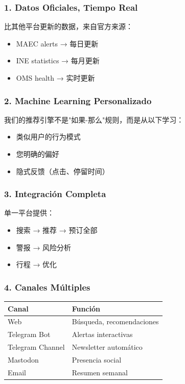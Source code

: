 \documentclass[11pt]{article}
\begin{document}
\subsubsection{1. Datos Oficiales, Tiempo Real}
\label{sec:org416fa64}

比其他平台更新的数据，来自官方来源：
\begin{itemize}
\item MAEC alerts → 每日更新
\item INE statistics → 每月更新
\item OMS health → 实时更新
\end{itemize}

\subsubsection{2. Machine Learning Personalizado}
\label{sec:orgc3e0df2}

我们的推荐引擎不是"如果-那么"规则，而是从以下学习：
\begin{itemize}
\item 类似用户的行为模式
\item 您明确的偏好
\item 隐式反馈（点击、停留时间）
\end{itemize}

\subsubsection{3. Integración Completa}
\label{sec:org50b9888}

单一平台提供：
\begin{itemize}
\item 搜索 → 推荐 → 预订全部
\item 警报 → 风险分析
\item 行程 → 优化
\end{itemize}

\subsubsection{4. Canales Múltiples}
\label{sec:org96a7a2a}

\begin{center}
\begin{tabular}{ll}
Canal & Función\\
\hline
Web & Búsqueda, recomendaciones\\
Telegram Bot & Alertas interactivas\\
Telegram Channel & Newsletter automático\\
Mastodon & Presencia social\\
Email & Resumen semanal\\
\end{tabular}
\end{center}
\end{document}
